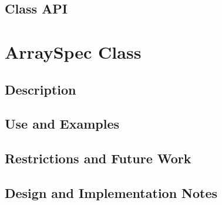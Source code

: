\documentclass[english]{article}
\begin{document}
\subsection{Class API}

\mbox{}\hrulefill
\mbox{}\hrulefill
%
%
\section{ArraySpec Class}
\subsection{Description}

\subsection{Use and Examples}


\subsection{Restrictions and Future Work}

\subsection{Design and Implementation Notes}

\end{document}
